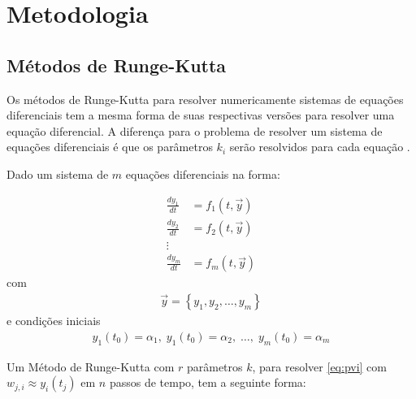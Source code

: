 \documentclass[final,5p]{elsarticle}
\numberwithin{equation}{section}
\begin{document}
\section{Metodologia}

    \subsection{Métodos de Runge-Kutta}

    Os métodos de Runge-Kutta para resolver numericamente sistemas de equações diferenciais tem a mesma forma de suas respectivas versões para resolver uma equação diferencial. A diferença para o problema de resolver um sistema de equações diferenciais é que os parâmetros $k_i$ serão resolvidos para cada equação \cite{burden2016analise}.

    Dado um sistema de $m$ equações diferenciais na forma:

    \begin{align}
        \frac{dy_1}{dt} &= f_1(t, \overrightarrow{y}) \nonumber \\
        \frac{dy_2}{dt} &= f_2(t, \overrightarrow{y}) \nonumber \\
        \vdots \nonumber \\
        \frac{dy_m}{dt} &= f_m(t, \overrightarrow{y}) \label{eq:pvi}
    \end{align}
    \noindent com
    \begin{align}
        \overrightarrow{y} = \left\{ y_1, y_2, \ldots, y_m \right\} \nonumber
    \end{align}
    \noindent e condições iniciais
    \begin{align}
        y_1(t_0) = \alpha_1, \; y_1(t_0) = \alpha_2, \; \ldots, \; y_m(t_0) = \alpha_m \nonumber
    \end{align}

    Um Método de Runge-Kutta com $r$ parâmetros $k$, para resolver \ref{eq:pvi} com $w_{j,i} \approx y_i(t_j)$ em $n$ passos de tempo, tem a seguinte forma:
\end{document}
